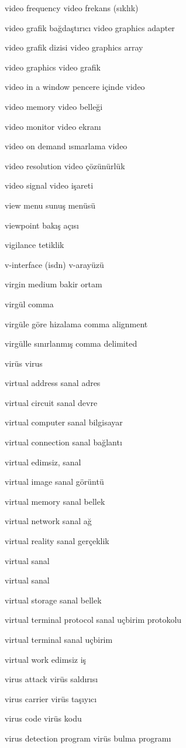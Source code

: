 \documentclass[12pt,fleqn]{article}\usepackage{../../common}
\begin{document}
video frequency video frekans (sıklık)

video grafik bağdaştırıcı video graphics adapter

video grafik dizisi video graphics array

video graphics video grafik

video in a window pencere içinde video

video memory video belleği

video monitor video ekranı

video on demand ısmarlama video

video resolution video çözünürlük

video signal video işareti

view menu sunuş menüsü

viewpoint bakış açısı

vigilance tetiklik

v-interface (isdn) v-arayüzü

virgin medium bakir ortam

virgül comma

virgüle göre hizalama comma alignment

virgülle sınırlanmış comma delimited

virüs virus

virtual address sanal adres

virtual circuit sanal devre

virtual computer sanal bilgisayar

virtual connection sanal bağlantı

virtual edimsiz, sanal

virtual image sanal görüntü

virtual memory sanal bellek

virtual network sanal ağ

virtual reality sanal gerçeklik

virtual sanal

virtual sanal

virtual storage sanal bellek

virtual terminal protocol sanal uçbirim protokolu

virtual terminal sanal uçbirim

virtual work edimsiz iş

virus attack virüs saldırısı

virus carrier virüs taşıyıcı

virus code virüs kodu

virus detection program virüs bulma programı
\end{document}
